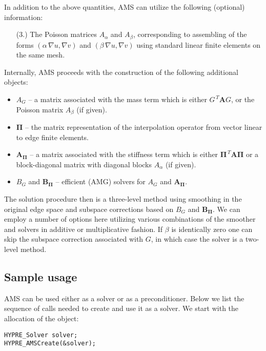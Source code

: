 In addition to the above quantities, AMS can utilize
the following (optional) information:
\begin{enumerate}
\item[(3.)] The Poisson matrices $A_\alpha$ and $A_\beta$, corresponding to
assembling of the forms $(\alpha\, \nabla u, \nabla v)$
and $(\beta\, \nabla u, \nabla v)$ using standard linear finite elements on
the same mesh.
\end{enumerate}

\noindent
Internally, AMS proceeds with the construction of the following additional objects:
\begin{itemize}
\item $A_G$ -- a matrix associated with the mass term which is either $G^{\,T} {\mathbf A} G$, or the Poisson matrix $A_\beta$ (if given).
\item ${\mathbf \Pi}$ -- the matrix representation of the interpolation operator
from vector linear to edge finite elements.
\item ${\mathbf A}_{{\mathbf \Pi}}$ -- a matrix associated with the stiffness term which is either  ${\mathbf \Pi}^{\,T} {\mathbf A} {\mathbf \Pi}$ or a block-diagonal matrix with diagonal blocks $A_\alpha$ (if given).
\item $B_G$ and ${\mathbf B}_{{\mathbf \Pi}}$ -- efficient (AMG) solvers for $A_G$ and ${\mathbf A}_{{\mathbf \Pi}}$.
\end{itemize}
The solution procedure then is a three-level method using smoothing in
the original edge space and subspace corrections based on $B_G$ and ${\mathbf B}_{{\mathbf \Pi}}$.
We can employ a number of options here utilizing various combinations of the smoother
and solvers in additive or multiplicative fashion.
If $\beta$ is identically zero one can skip the subspace correction associated
with $G$, in which case the solver is a two-level method.

\subsection{Sample usage}
AMS can be used either as a solver or as a preconditioner.
Below we list the sequence of \hypre{} calls
needed to create and use it as a solver.
We start with the allocation of the  object:
\begin{display}\begin{verbatim}
HYPRE_Solver solver;
HYPRE_AMSCreate(&solver);
\end{verbatim}\end{display}

